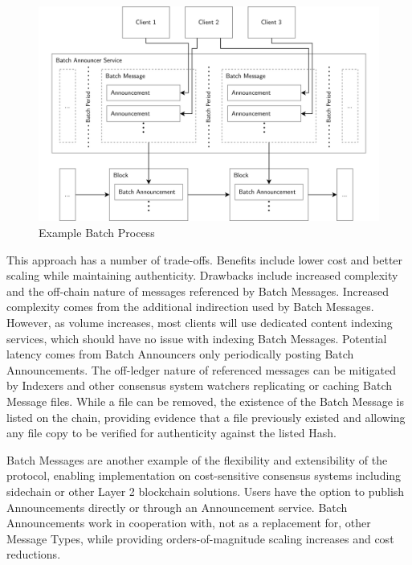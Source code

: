 \documentclass[12pt,letterpaper]{article}
\begin{document}
\begin{appendices}
	\begin{figure}
		\includegraphics[width=\linewidth]{figures/Example Batch Process.png}
		\caption{Example Batch Process}
		\label{fig:10}
	\end{figure}

	This approach has a number of trade-offs. Benefits include lower cost and better
        scaling while maintaining authenticity. Drawbacks include increased complexity and
        the off-chain nature of messages referenced by Batch Messages. Increased complexity
        comes from the additional indirection used by Batch Messages. However, as volume
        increases, most clients will use dedicated content indexing services, which should
        have no issue with indexing Batch Messages. Potential latency comes from Batch
        Announcers only periodically posting Batch Announcements. The off-ledger nature of
        referenced messages can be mitigated by Indexers and other consensus system watchers
        replicating or caching Batch Message files.  While a file can be removed, the
        existence of the Batch Message is listed on the chain, providing evidence that a
        file previously existed and allowing any file copy to be verified for authenticity
        against the listed Hash.

	Batch Messages are another example of the flexibility and extensibility of the
        protocol, enabling implementation on cost-sensitive consensus systems including
        sidechain or other Layer 2 blockchain solutions.  Users have the option to publish
        Announcements directly or through an Announcement service. Batch Announcements work
        in cooperation with, not as a replacement for, other Message Types, while providing
        orders-of-magnitude scaling increases and cost reductions.

\end{appendices}
\end{document}
